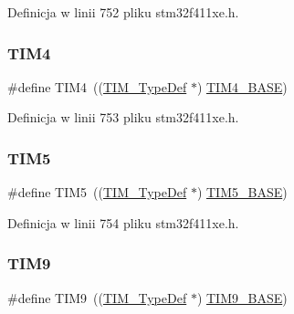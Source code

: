 Definicja w linii 752 pliku stm32f411xe.\+h.

\mbox{\label{group___peripheral__declaration_ga91a09bad8bdc7a1cb3d85cf49c94c8ec}} 
\subsubsection{\texorpdfstring{T\+I\+M4}{TIM4}}
{\footnotesize\ttfamily \#define T\+I\+M4~((\hyperlink{struct_t_i_m___type_def}{T\+I\+M\+\_\+\+Type\+Def} $\ast$) \hyperlink{group___peripheral__memory__map_ga56e2d44b0002f316527b8913866a370d}{T\+I\+M4\+\_\+\+B\+A\+SE})}



Definicja w linii 753 pliku stm32f411xe.\+h.

\mbox{\label{group___peripheral__declaration_ga5125ff6a23a2ed66e2e19bd196128c14}} 
\subsubsection{\texorpdfstring{T\+I\+M5}{TIM5}}
{\footnotesize\ttfamily \#define T\+I\+M5~((\hyperlink{struct_t_i_m___type_def}{T\+I\+M\+\_\+\+Type\+Def} $\ast$) \hyperlink{group___peripheral__memory__map_ga3e1671477190d065ba7c944558336d7e}{T\+I\+M5\+\_\+\+B\+A\+SE})}



Definicja w linii 754 pliku stm32f411xe.\+h.

\mbox{\label{group___peripheral__declaration_gaf52b4b4c36110a0addfa98059f54a50e}} 
\subsubsection{\texorpdfstring{T\+I\+M9}{TIM9}}
{\footnotesize\ttfamily \#define T\+I\+M9~((\hyperlink{struct_t_i_m___type_def}{T\+I\+M\+\_\+\+Type\+Def} $\ast$) \hyperlink{group___peripheral__memory__map_ga92ae902be7902560939223dd765ece08}{T\+I\+M9\+\_\+\+B\+A\+SE})}



